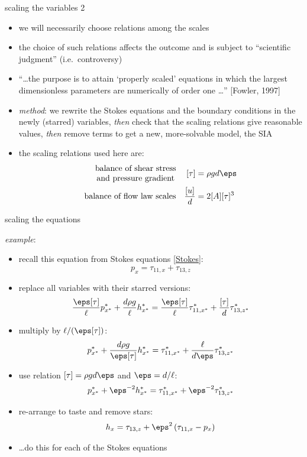 \begin{frame}{scaling the variables 2}

\begin{itemize}
\item we will necessarily choose relations among the scales
\item the choice of such relations affects the outcome and is subject to ``scientific judgment'' (i.e.~controversy)
\item ``\dots the purpose is to attain `properly scaled' equations in which the largest dimensionless parameters are numerically of order one \dots'' [Fowler, 1997]
\item \emph{method}: we rewrite the Stokes equations and the boundary conditions in the newly (starred) variables, \emph{then} check that the scaling relations give reasonable values, \emph{then} remove terms to get a new, more-solvable model, the SIA
\item the scaling relations used here are:
\begin{align*}
\begin{matrix}
\text{balance of shear stress} \\
\text{and pressure gradient}
\end{matrix} && [\tau] &= \rho g d \eps \\
\text{balance of flow law scales} && \frac{[u]}{d} &= 2 [A] [\tau]^3
\end{align*}
\end{itemize}
\end{frame}


\begin{frame}{scaling the equations}

\small
\emph{example}:
\begin{itemize}
\item recall this equation from Stokes equations \eqref{Stokes}:
  $$p_x = \tau_{11,x} + \tau_{13,z}$$
\item replace all variables with their starred versions:
  $$\frac{\eps [\tau]}{\ell} p^*_{x^*}+ \frac{d \rho g}{\ell} h^*_{x^*} = \frac{\eps [\tau]}{\ell} \tau^*_{11,x^*} + \frac{[\tau]}{d}\tau^*_{13,z^*}$$
\item multiply by $\ell / (\eps [\tau])$:
  $$p^*_{x^*}+ \frac{d \rho g}{\eps [\tau]} h^*_{x^*} = \tau^*_{11,x^*} + \frac{\ell}{d \eps}\tau^*_{13,z^*}$$
\item use relation $[\tau] = \rho g d \eps$ and $\eps = d/\ell$:
  $$p^*_{x^*}+ \eps^{-2} h^*_{x^*} = \tau^*_{11,x^*} + \eps^{-2}\tau^*_{13,z^*}$$
\item re-arrange to taste and remove stars:
	$$h_x = \tau_{13,z} + \eps^2 \left(\tau_{11,x} - p_x\right)$$
\item \dots do this for each of the Stokes equations
\end{itemize}
\end{frame}


